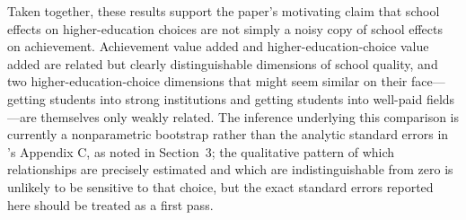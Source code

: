 \documentclass[a4paper, article, english, oneside, unknownkeysallowed, 12pt]{memoir}
\begin{document}
Taken together, these results support the paper's motivating claim that school effects on higher-education choices are not simply a noisy copy of school effects on achievement.
Achievement value added and higher-education-choice value added are related but clearly distinguishable dimensions of school quality, and two higher-education-choice dimensions that might seem similar on their face---getting students into strong institutions and getting students into well-paid fields---are themselves only weakly related.
The inference underlying this comparison is currently a nonparametric bootstrap rather than the analytic standard errors in \textcite{rose_effects_2022}'s Appendix C, as noted in Section~3; the qualitative pattern of which relationships are precisely estimated and which are indistinguishable from zero is unlikely to be sensitive to that choice, but the exact standard errors reported here should be treated as a first pass.

\end{document}

